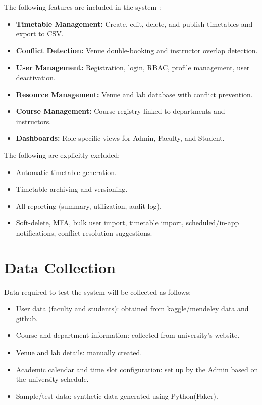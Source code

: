 \documentclass[12pt, a4paper]{report}
\begin{document}
The following features are included in the system \cite{srs}:

\begin{itemize}
    \item \textbf{Timetable Management:} Create, edit, delete, and publish timetables and export to CSV.
    \item \textbf{Conflict Detection:} Venue double-booking and instructor overlap detection.
    \item \textbf{User Management:} Registration, login, RBAC, profile management, user deactivation.
    \item \textbf{Resource Management:} Venue and lab database with conflict prevention.
    \item \textbf{Course Management:} Course registry linked to departments and instructors.
    \item \textbf{Dashboards:} Role-specific views for Admin, Faculty, and Student.
\end{itemize}

The following are explicitly excluded:

\begin{itemize}
    \item Automatic timetable generation.
    \item Timetable archiving and versioning.
    \item All reporting (summary, utilization, audit log).
    \item Soft-delete, MFA, bulk user import, timetable import, scheduled/in-app notifications, conflict resolution suggestions.
\end{itemize}

\section{Data Collection}

Data required to test the system will be collected as follows:

\begin{itemize}
    \item User data (faculty and students): obtained from kaggle/mendeley data and github.
    \item Course and department information: collected from university's website.
    \item Venue and lab details: manually created.
    \item Academic calendar and time slot configuration: set up by the Admin based on the university schedule.
    \item Sample/test data: synthetic data generated using Python(Faker).
\end{itemize}
\end{document}
